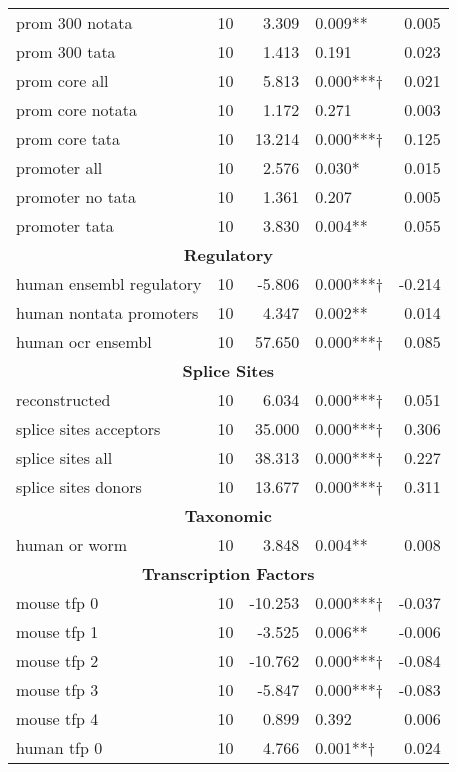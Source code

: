 \begin{table}[]
\begin{center}
\begin{tabular}{@{}lcrlr@{}}
prom 300 notata & 10 & 3.309 & 0.009** & 0.005 \\
prom 300 tata & 10 & 1.413 & 0.191 & 0.023 \\
\rowcolor{teal!25}prom core all & 10 & 5.813 & 0.000***† & 0.021 \\
prom core notata & 10 & 1.172 & 0.271 & 0.003 \\
\rowcolor{teal!25}prom core tata & 10 & 13.214 & 0.000***† & 0.125 \\
promoter all & 10 & 2.576 & 0.030* & 0.015 \\
promoter no tata & 10 & 1.361 & 0.207 & 0.005 \\
promoter tata & 10 & 3.830 & 0.004** & 0.055 \\
\midrule
\multicolumn{5}{c}{\textbf{Regulatory}} \\
\midrule
\rowcolor{magenta!25}human ensembl regulatory & 10 & -5.806 & 0.000***† & -0.214 \\
human nontata promoters & 10 & 4.347 & 0.002** & 0.014 \\
\rowcolor{teal!25}human ocr ensembl & 10 & 57.650 & 0.000***† & 0.085 \\
\midrule
\multicolumn{5}{c}{\textbf{Splice Sites}} \\
\midrule
\rowcolor{teal!25}reconstructed & 10 & 6.034 & 0.000***† & 0.051 \\
\rowcolor{teal!25}splice sites acceptors & 10 & 35.000 & 0.000***† & 0.306 \\
\rowcolor{teal!25}splice sites all & 10 & 38.313 & 0.000***† & 0.227 \\
\rowcolor{teal!25}splice sites donors & 10 & 13.677 & 0.000***† & 0.311 \\
\midrule
\multicolumn{5}{c}{\textbf{Taxonomic}} \\
\midrule
human or worm & 10 & 3.848 & 0.004** & 0.008 \\
\midrule
\multicolumn{5}{c}{\textbf{Transcription Factors}} \\
\midrule
\rowcolor{magenta!25}mouse tfp 0 & 10 & -10.253 & 0.000***† & -0.037 \\
mouse tfp 1 & 10 & -3.525 & 0.006** & -0.006 \\
\rowcolor{magenta!25}mouse tfp 2 & 10 & -10.762 & 0.000***† & -0.084 \\
\rowcolor{magenta!25}mouse tfp 3 & 10 & -5.847 & 0.000***† & -0.083 \\
mouse tfp 4 & 10 & 0.899 & 0.392 & 0.006 \\
\rowcolor{teal!25}human tfp 0 & 10 & 4.766 & 0.001**† & 0.024 \\

\end{tabular}
\end{center}
\end{table}
